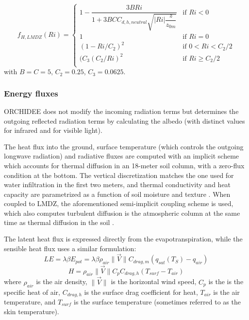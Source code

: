 \begin{equation}
f_{H, LMDZ}(Ri) = 
\begin{cases}
1 - \dfrac{3 B Ri}{1 + 3 B C C_{d,h,neutral} \sqrt{|Ri| \dfrac{z}{z_{0m}}}} & \text{if } Ri < 0 \\
1 & \text{if } Ri=0\\
(1-Ri/C_2)^2 & \text{if } 0 < Ri < C_2/2\\
(C_3(C_2/Ri)^2 & \text{if } Ri \geq C_2/2\\
\end{cases}
\end{equation}
with $B=C=5$, $C_2 = 0.25$, $C_3 = 0.0625$.

\hfill

\subsubsection*{Energy fluxes}

ORCHIDEE does not modify the incoming radiation terms but determines the outgoing reflected radiation terms by calculating the albedo (with distinct values for infrared and for visible light).

The heat flux into the ground, surface temperature (which controls the outgoing longwave radiation) and radiative fluxes are computed with an implicit scheme which accounts for thermal diffusion in an 18-meter soil column, with a zero-flux condition at the bottom. 
The vertical discretization matches the one used for water infiltration in the first two meters, and thermal conductivity and heat capacity are parametrized as a function of soil moisture and texture \citep{wang_improvement_2016}.
When coupled to LMDZ, the aforementioned semi-implicit coupling scheme is used, which also computes turbulent diffusion is the atmospheric column at the same time as thermal diffusion in the soil \citep{polcher_proposal_1998, Hourdin_phdthesis, hourdin_2002}. 

The latent heat flux is expressed directly from the evapotranspiration, while the sensible heat flux uses a similar formulation:
\begin{equation}
    LE = \lambda \beta E_{pot} = \lambda \beta \rho_{air} \lVert \vec{V} \rVert C_{drag, m} (q_{sat}(T_S) - q_{air})
\end{equation}
\begin{equation}
    H = \rho_{air}  \lVert \vec{V} \rVert C_p C_{drag, h} (T_{surf} - T_{air})
\end{equation}
where $\rho_{air}$ is the air density, $\lVert \vec{V} \rVert$ is the horizontal wind speed, $C_p$ is the is the specific heat of air, $C_{drag, h}$ is the surface drag coefficient for heat, $T_{air}$ is the air temperature, and $T_{surf}$ is the surface temperature (sometimes referred to as the skin temperature).

